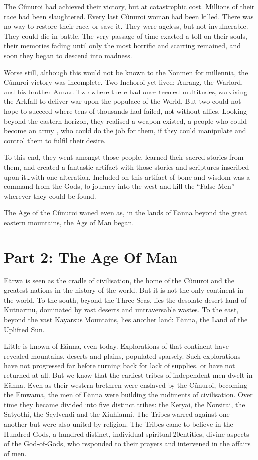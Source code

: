 \documentclass[]{book}
\begin{document}
The Cûnuroi had achieved their victory, but at catastrophic cost. Millions of their race
had been slaughtered. Every last Cûnuroi woman had been killed. There was no way to
restore their race, or save it. They were ageless, but not invulnerable. They could die in
battle. The very passage of time exacted a toll on their souls, their memories fading
until only the most horrific and scarring remained, and soon they began to descend
into madness.

Worse still, although this would not be known to the Nonmen for millennia, the
Cûnuroi victory was incomplete. Two Inchoroi yet lived: Aurang, the Warlord, and his
brother Aurax. Two where there had once teemed multitudes, surviving the Arkfall to
deliver war upon the populace of the World. But two could not hope to succeed where
tens of thousands had failed, not without allies. Looking beyond the eastern horizon,
they realised a weapon existed, a people who could become an army , who could do the
job for them, if they could manipulate and control them to fulfil their desire.

To this end, they went amongst those people, learned their sacred stories from them,
and created a fantastic artifact with those stories and scriptures inscribed upon it\ldots{}with
one alteration. Included on this artifact of bone and wisdom was a command from the
Gods, to journey into the west and kill the ``False Men'' wherever they could be found.

The Age of the Cûnuroi waned even as, in the lands of Eänna beyond the great eastern
mountains, the Age of Man began.

\hypertarget{part-2-the-age-of-man}{%
\chapter{Part 2: The Age Of Man}\label{part-2-the-age-of-man}}

Eärwa is seen as the cradle of civilisation, the home of the Cûnuroi and the greatest
nations in the history of the world. But it is not the only continent in the world. To the
south, beyond the Three Seas, lies the desolate desert land of Kutnarmu, dominated by
vast deserts and untraversable wastes. To the east, beyond the vast Kayarsus Mountains,
lies another land: Eänna, the Land of the Uplifted Sun.

Little is known of Eänna, even today. Explorations of that continent have revealed
mountains, deserts and plains, populated sparsely. Such explorations have not
progressed far before turning back for lack of supplies, or have not returned at all. But
we know that the earliest tribes of independent men dwelt in Eänna. Even as their
western brethren were enslaved by the Cûnuroi, becoming the Emwama, the men of
Eänna were building the rudiments of civilisation. Over time they became divided into
five distinct tribes: the Ketyai, the Norsirai, the Satyothi, the Scylvendi and the
Xiuhianni. The Tribes warred against one another but were also united by religion. The
Tribes came to believe in the Hundred Gods, a hundred distinct, individual spiritual
20entities, divine aspects of the God-of-Gods, who responded to their prayers and
intervened in the affairs of men.
\end{document}
